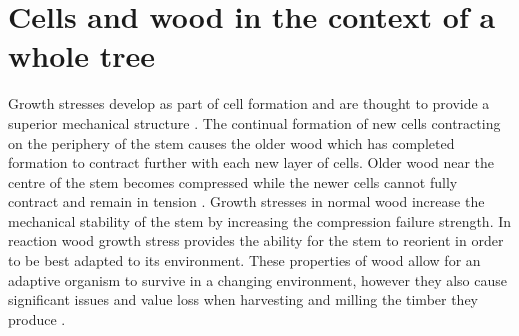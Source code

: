 \section{Cells and wood in the context of a whole tree}
Growth stresses develop as part of cell formation and are thought to provide a
superior mechanical structure \cite{mattheck1997wood}. The continual formation of new cells contracting
on the periphery of the stem causes the older wood which has completed formation
to contract further with each new layer of cells. Older wood near the centre
of the stem becomes compressed while the newer cells cannot fully contract and
remain in tension \cite{Archer_1987}.
Growth stresses in normal wood increase the mechanical stability of the stem by increasing the compression failure strength. In reaction wood growth stress provides the ability for the stem to reorient in
order to be best adapted to its environment. These properties
of wood allow for an adaptive organism to survive in a changing environment,
however they also cause significant issues and value loss when harvesting and
milling the timber they produce \cite{kubler_1987}.
